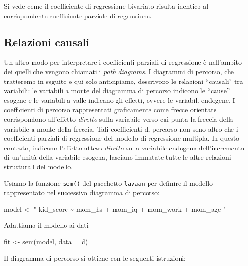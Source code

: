 \documentclass[
  11pt,
]{krantz}
\makeatletter
\newenvironment{Shaded}{\begin{snugshade}}{\end{snugshade}}
\newcommand{\AttributeTok}[1]{\textcolor[rgb]{0.61,0.61,0.61}{#1}}
\newcommand{\FunctionTok}[1]{\textcolor[rgb]{0,0,0}{#1}}
\newcommand{\NormalTok}[1]{#1}
\newcommand{\OtherTok}[1]{\textcolor[rgb]{0.37,0.37,0.37}{#1}}
\newcommand{\StringTok}[1]{\textcolor[rgb]{0.5,0.5,0.5}{#1}}
\newenvironment{kframe}{%
\medskip{}
\setlength{\fboxsep}{.8em}
 \def\at@end@of@kframe{}%
 \ifinner\ifhmode%
  \def\at@end@of@kframe{\end{minipage}}%
  \begin{minipage}{\columnwidth}%
 \fi\fi%
 \def\FrameCommand##1{\hskip\@totalleftmargin \hskip-\fboxsep
 \colorbox{shadecolor}{##1}\hskip-\fboxsep
     \hskip-\linewidth \hskip-\@totalleftmargin \hskip\columnwidth}%
 \MakeFramed {\advance\hsize-\width
   \@totalleftmargin\z@ \linewidth\hsize
   \@setminipage}}%
 {\par\unskip\endMakeFramed%
 \at@end@of@kframe}
\renewenvironment{Shaded}{\begin{kframe}}{\end{kframe}}
\theoremstyle{definition}
\theoremstyle{definition}
\theoremstyle{definition}
\theoremstyle{definition}
\theoremstyle{remark}
\makeatother
\begin{document}
Si vede come il coefficiente di regressione bivariato risulta identico al corrispondente coefficiente parziale di regressione.

\hypertarget{relazioni-causali}{%
\subsection{Relazioni causali}\label{relazioni-causali}}

Un altro modo per interpretare i coefficienti parziali di regressione è nell'ambito dei quelli che vengono chiamati i \emph{path diagrams}. I diagrammi di percorso, che tratteremo in seguito e qui solo anticipiamo, descrivono le relazioni ``causali'' tra variabili: le variabili a monte del diagramma di percorso indicono le ``cause'' esogene e le variabili a valle indicano gli effetti, ovvero le variabili endogene. I coefficienti di percorso rappresentati graficamente come frecce orientate corrispondono all'effetto \emph{diretto} sulla variabile verso cui punta la freccia della variabile a monte della freccia. Tali coefficienti di percorso non sono altro che i coefficienti parziali di regressione del modello di regressione multipla. In questo contesto, indicano l'effetto atteso \emph{diretto} sulla variabile endogena dell'incremento di un'unità della variabile esogena, lasciano immutate tutte le altre relazioni strutturali del modello.

Usiamo la funzione \texttt{sem()} del pacchetto \texttt{lavaan} per definire il modello rappresentato nel successivo diagramma di percorso:

\begin{Shaded}
\begin{Highlighting}[]
\NormalTok{model }\OtherTok{\textless{}{-}} \StringTok{"}
\StringTok{  kid\_score \textasciitilde{} mom\_hs + mom\_iq + mom\_work + mom\_age}
\StringTok{"}
\end{Highlighting}
\end{Shaded}

Adattiamo il modello ai dati

\begin{Shaded}
\begin{Highlighting}[]
\NormalTok{fit }\OtherTok{\textless{}{-}} \FunctionTok{sem}\NormalTok{(model, }\AttributeTok{data =}\NormalTok{ d)}
\end{Highlighting}
\end{Shaded}

Il diagramma di percorso si ottiene con le seguenti istruzioni:
\end{document}
